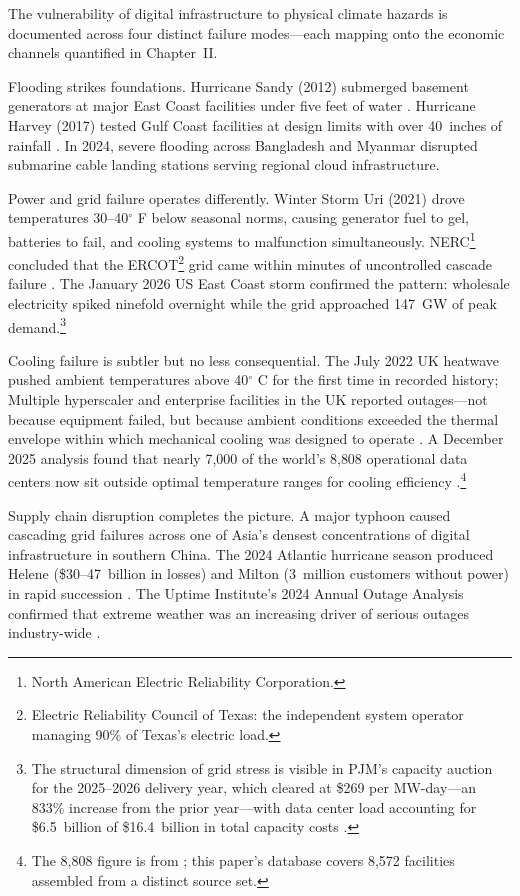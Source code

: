 \begin{twocolbody}
The vulnerability of digital infrastructure to physical climate hazards is documented across four distinct failure modes---each mapping onto the economic channels quantified in Chapter~II.

Flooding strikes foundations. Hurricane Sandy (2012) submerged basement generators at major East Coast facilities under five feet of water \citep{dcd2012sandy}. Hurricane Harvey (2017) tested Gulf Coast facilities at design limits with over 40~inches of rainfall \citep{trgdc2024harvey}. In 2024, severe flooding across Bangladesh and Myanmar disrupted submarine cable landing stations serving regional cloud infrastructure.

Power and grid failure operates differently. Winter Storm Uri (2021) drove temperatures 30--40$^\circ$ F below seasonal norms, causing generator fuel to gel, batteries to fail, and cooling systems to malfunction simultaneously. NERC\footnote{North American Electric Reliability Corporation.} concluded that the ERCOT\footnote{Electric Reliability Council of Texas: the independent system operator managing 90\% of Texas's electric load.} grid came within minutes of uncontrolled cascade failure \citep{datacenterknowledge2021, nerc2025}. The January 2026 US East Coast storm confirmed the pattern: wholesale electricity spiked ninefold overnight while the grid approached 147~GW of peak demand.\footnote{The structural dimension of grid stress is visible in PJM's capacity auction for the 2025--2026 delivery year, which cleared at \$269 per MW-day---an 833\% increase from the prior year---with data center load accounting for \$6.5~billion of \$16.4~billion in total capacity costs \citep{utilitydive2026pjm, ieefa2025pjm}.}

Cooling failure is subtler but no less consequential. The July 2022 UK heatwave pushed ambient temperatures above 40$^\circ$ C for the first time in recorded history; Multiple hyperscaler and enterprise facilities in the UK reported outages---not because equipment failed, but because ambient conditions exceeded the thermal envelope within which mechanical cooling was designed to operate \citep{datacenterknowledge2021}. A December 2025 analysis found that nearly 7{,}000 of the world's 8{,}808 operational data centers now sit outside optimal temperature ranges for cooling efficiency \citep{restofworld2025}.\footnote{The 8{,}808 figure is from \citealt{restofworld2025}; this paper's database covers 8{,}572 facilities assembled from a distinct source set.}

Supply chain disruption completes the picture. A major typhoon caused cascading grid failures across one of Asia's densest concentrations of digital infrastructure in southern China. The 2024 Atlantic hurricane season produced Helene (\$30--47~billion in losses) and Milton (3~million customers without power) in rapid succession \citep{hexatronic2025storms}. The Uptime Institute's 2024 Annual Outage Analysis confirmed that extreme weather was an increasing driver of serious outages industry-wide \citep{techtarget2024}.


\end{twocolbody}
